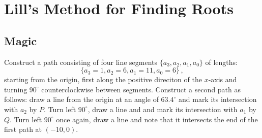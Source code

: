 

\chapter{Lill's Method for Finding Roots}\label{c.lill}

\section{Magic}\label{s.magic}

Construct a path consisting of four line segments $\{a_3,a_2,a_1,a_0\}$ of lengths:
\[
\{a_3=1,a_2=6,a_1=11,a_0=6\}\,,
\]
starting from the origin, first along the positive direciton of the $x$-axis and turning $90^\circ$ counterclockwise between segments. Construct a second path as follows: draw a line from the origin at an angle of $63.4^\circ$ and mark its intersection with $a_2$ by $P$. Turn left $90^\circ$, draw a line and and mark its intersection with $a_1$ by $Q$. Turn left $90^\circ$ once again, draw a line and note that it intersects the end of the first path at $(-10,0)$. %

